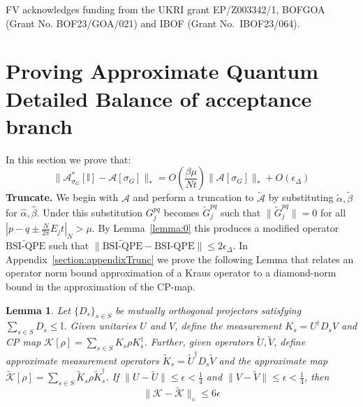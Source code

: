 \documentclass[aps,floatfix,10pt,amssymb,amsfont,amsmath,superscriptaddress,float,nofootinbib,longbibliography,nobalancelastpage,twocolumn]{revtex4-2}
\newtheorem{lemma}{Lemma}
\begin{document}
\begin{acknowledgements}
FV acknowledges funding from the UKRI grant EP/Z003342/1, BOFGOA
(Grant No. BOF23/GOA/021) and IBOF (Grant No.~IBOF23/064).
\end{acknowledgements}


\appendix
\onecolumngrid    
\section{Proving Approximate Quantum Detailed Balance of acceptance branch}
\label{appendix:Aproof}
In this section we prove that:
\begin{equation}
    \|\mathcal{A}^*_{\sigma_G}[\mathbb{I}] - \mathcal{A}[\sigma_G]\|_* = O\!\left(\frac{\beta\mu}{Nt}\right)\|\mathcal{A}[\sigma_G]\|_* + O\!\left(\epsilon_{\Delta}\right)
\end{equation}
\textbf{Truncate.} We begin with $\mathcal{A}$ and perform a truncation to $\tilde{\mathcal{A}}$ by substituting $\tilde \alpha, \tilde \beta$ for $\hat \alpha, \hat \beta$. Under this substitution $G^{pq}_j$ becomes $\tilde G^{pq}_j$ such that $\|\tilde G^{pq}_j\| =0$ for all $|p-q\pm\frac{N}{2\pi}E_jt|_{N} > \mu$.  By Lemma~\ref{lemma:0} this produces a modified operator $\widetilde{\text{BSI-QPE}}$ such that $\|\widetilde{\text{BSI-QPE}}- \text{BSI-QPE}\| \leq 2\epsilon_{\Delta}$. In Appendix~\ref{section:appendixTrunc} we prove the following Lemma that relates an operator norm bound approximation of a Kraus operator to a diamond-norm bound in the approximation of the CP-map.
\begin{lemma}
\label{lemma:3}
Let $\{D_s\}_{s\in S}$ be mutually orthogonal projectors satisfying $\sum_{s\in S} D_s \leq \mathbb{I}$. Given unitaries $U$ and $V$, define the measurement $K_s = U^{\dagger}D_s V$ and CP map $\mathcal{K}[\rho] = \sum_{s \in S} K_s\rho K_s^{\dagger}$. Further, given operators $\tilde U, \tilde V$, define approximate measurement operators $\tilde K_s = \tilde U^{\dagger}D_s \tilde V$ and the approximate map $\tilde{\mathcal{K}}[\rho] = \sum_{s \in S} \tilde K_s\rho \tilde K_s^{\dagger}$. If $\|U-\tilde U\| \leq \epsilon<\frac14$ and $\|V-\tilde V\| \leq \epsilon<\frac14$, then 
\begin{equation}
    \|\mathcal{K} - \tilde{\mathcal{K}}\|_{\diamond} \leq 6\epsilon
\end{equation}
\end{lemma}
\end{document}
